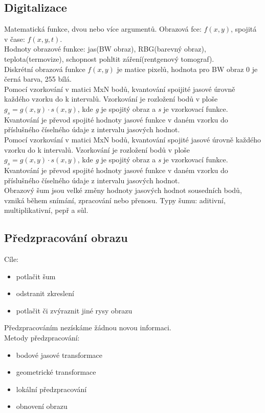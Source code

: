 \subsection{Digitalizace}
Matematická funkce, dvou nebo více argumentů. Obrazová fce: \(f(x,y)\), spojitá v čase: \(f(x,y,t)\).\\
Hodnoty obrazové funkce: jas(BW obraz), RBG(barevný obraz), teplota(termovize), schopnost pohltit záření(rentgenový tomograf).\\
Diskrétní obrazová funkce \(f(x,y)\) je matice pixelů, hodnota pro BW obraz 0 je černá barva, 255 bílá.\\
Pomocí vzorkování v matici MxN bodů, kvantování spoijité jasové úrovně každého vzorku do k intervalů. Vzorkování je rozložení bodů v ploše \(g_s = g(x,y)\cdot s(x,y)\), kde \textit{g} je spojitý obraz a \textit{s} je vzorkovací funkce. Kvantování je převod spojité hodnoty jasové funkce v daném vzorku do příslušného číselného údaje z intervalu jasových hodnot.\\
Pomocí vzorkování v matici MxN bodů, kvantování spojité jasové úrovně každého vzorku do k intervalů. Vzorkování je rozložení bodů v ploše \(g_s = g(x,y)\cdot s(x,y)\), kde \textit{g} je spojitý obraz a \textit{s} je vzorkovací funkce. Kvantování je převod spojité hodnoty jasové funkce v daném vzorku do příslušného číselného údaje z intervalu jasových hodnot.\\
Obrazový šum jsou velké změny hodnoty jasových hodnot sousedních bodů, vzniká během snímání, zpracování nebo přenosu. Typy šumu: aditivní, multiplikativní, pepř a sůl.\\

\subsection{Předzpracování obrazu}
Cíle:
\begin{itemize}
    \item potlačit šum
    \item odstranit zkreslení
    \item potlačit či zvýraznit jiné rysy obrazu
\end{itemize}
Předzpracováním nezískáme žádnou novou informaci.\\
Metody předzpracování:
\begin{itemize}
    \item bodové jasové transformace
    \item geometrické transformace
    \item lokální předzpracování
    \item obnovení obrazu
\end{itemize}

